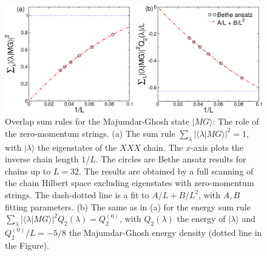 \documentclass[11pt]{iopart}
\begin{document}
\begin{figure}[t]
\begin{center}
\includegraphics[width=.9\textwidth]{./draft_figs/Dimer}
\end{center}
\caption{Overlap sum rules for the Majumdar-Ghosh state $|MG\rangle$: 
 The role of the zero-momentum strings. (a) The sum rule $\sum_{\lambda}|
 \langle\lambda|MG\rangle|^2=1$, with $|\lambda\rangle$ the eigenstates   
 of the $XXX$ chain. The $x$-axis plots the inverse chain length $1/L$. 
 The circles are Bethe ansatz results for chains up to $L=32$. The results 
 are obtained by a full scanning of the chain Hilbert space excluding eigenstates with zero-momentum strings. 
 The dash-dotted line is a fit to $A/L+B/L^2$, with $A,B$ fitting parameters. 
 (b) The same as in (a) for the energy sum rule $\sum_{\lambda}|\langle\lambda|MG\rangle
 |^2Q_2(\lambda)=Q_2^{(0)}$, with $Q_2(\lambda)$  the energy of $|\lambda
 \rangle$ and $Q_2^{(0)}/L=-5/8$ the Majumdar-Ghosh energy density (dotted 
 line in the Figure). 
}
\label{fig2:dimer-sr}
\end{figure}
\end{document}
